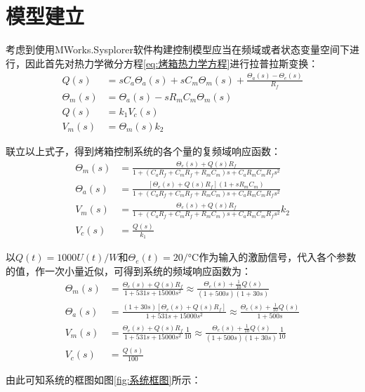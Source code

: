 \documentclass[11pt]{article}
\begin{document}
\section{模型建立}
考虑到使用MWorks.Sysplorer软件构建控制模型应当在频域或者状态变量空间下进行，因此首先对热力学微分方程\ref{eq:烤箱热力学方程}进行拉普拉斯变换：
\begin{align*}
  Q(s)        & =sC_a\Theta_a(s)+sC_m\Theta_m(s)+\frac{\Theta_a(s)-\Theta_e(s)}{R_f} \\
  \Theta_m(s) & =\Theta_a(s)-sR_mC_m\Theta_m(s)                                      \\
  Q(s)        & =k_1V_c(s)                                                           \\
  V_m(s)      & =\Theta_m(s)k_2
  \label{eq:烤箱热力学方程拉普拉斯}
\end{align*}\par
联立以上式子，得到烤箱控制系统的各个量的复频域响应函数：
\begin{align*}
  \Theta_m(s) & =\frac{\Theta_e(s)+Q(s)R_f}{1+(C_aR_f+C_mR_f+R_mC_m)s+C_aR_mC_mR_fs^2}              \\
  \Theta_a(s) & =\frac{[\Theta_e(s)+Q(s)R_f](1+sR_mC_m)}{1+(C_aR_f+C_mR_f+R_mC_m)s+C_aR_mC_mR_fs^2} \\
  V_m(s)      & =\frac{\Theta_e(s)+Q(s)R_f}{1+(C_aR_f+C_mR_f+R_mC_m)s+C_aR_mC_mR_fs^2}k_2           \\
  V_c(s)      & =\frac{Q(s)}{k_1}
\end{align*}\par
以$Q(t)=1000U(t)/\unit{W}$和$\Theta_e(t)=20/\unit{\celsius}$作为输入的激励信号，代入各个参数的值，作一次小量近似，可得到系统的频域响应函数为：
\begin{align*}
  \Theta_m(s) & =\frac{\Theta_e(s)+Q(s)R_f}{1+531s+15000s^2}\approx\frac{\Theta_e(s)+\frac{1}{10}Q(s)}{(1+500s)(1+30s)} \\
  \Theta_a(s) & =\frac{(1+30s)[\Theta_e(s)+Q(s)R_f]}{1+531s+15000s^2}\approx\frac{\Theta_e(s)+\frac{1}{10}Q(s)}{1+500s}     \\
  V_m(s)      & =\frac{\Theta_e(s)+Q(s)R_f}{1+531s+15000s^2}\frac{1}{10}   \approx\frac{\Theta_e(s)+\frac{1}{10}Q(s)}{(1+500s)(1+30s)}\frac{1}{10} \\
  V_c(s)      & =\frac{Q(s)}{100}
\end{align*}\par
由此可知系统的框图如图\ref{fig:系统框图}所示：
\end{document}
